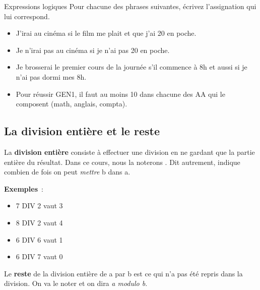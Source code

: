 			\begin{Exercice}{Expressions logiques}
				Pour chacune des phrases suivantes,
				écrivez l’assignation qui lui correspond.
				\begin{itemize}
				\item J’irai au cinéma si le film me plait et que j’ai 20\texteuro{} en poche.
				\item Je n’irai pas au cinéma si je n’ai pas 20\texteuro{} en poche.
				\item Je brosserai le premier cours de la journée s’il commence à 8h et aussi si je n’ai pas dormi mes 8h.
				\item Pour réussir GEN1, il faut au moins 10 dans chacune des AA qui le composent (math, anglais, compta).	
				\end{itemize}
			\end{Exercice}
			
		\subsection{La division entière et le reste}
		
			La \textbf{division entière} consiste à effectuer une division
			en ne gardant que la partie entière du résultat.
			Dans ce cours, nous la noterons .
			Dit autrement, 
			indique combien de fois on peut \emph{mettre} b dans a.
			
			\begin{minipage}{2cm}
			\textbf{Exemples}~:	
			\\
			\end{minipage}
			\begin{minipage}{9cm}
			\begin{multicols}{2}
			\begin{itemize}
				\item 7 DIV 2 vaut 3
				\item 8 DIV 2 vaut 4
				\item 6 DIV 6 vaut 1
				\item 6 DIV 7 vaut 0
			\end{itemize}
			\end{multicols}
			\end{minipage}
			
			Le \textbf{reste} de la division entière de a par b
			est ce qui n’a pas été repris dans la division.
			On va le noter 
			et on dira \emph{a modulo b}.
	
